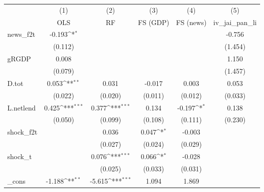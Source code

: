 {
\def\sym#1{\ifmmode^{#1}\else\(^{#1}\)\fi}
\begin{tabular}{l*{5}{c}}
\toprule
            &\multicolumn{1}{c}{(1)}&\multicolumn{1}{c}{(2)}&\multicolumn{1}{c}{(3)}&\multicolumn{1}{c}{(4)}&\multicolumn{1}{c}{(5)}\\
            &\multicolumn{1}{c}{OLS}&\multicolumn{1}{c}{RF}&\multicolumn{1}{c}{FS (GDP)}&\multicolumn{1}{c}{FS (news)}&\multicolumn{1}{c}{iv\_jai\_pan\_li}\\
\midrule
news\_f2t    &      -0.193\sym{*}  &                     &                     &                     &      -0.756         \\
            &     (0.112)         &                     &                     &                     &     (1.454)         \\
\addlinespace
gRGDP       &       0.008         &                     &                     &                     &       1.150         \\
            &     (0.079)         &                     &                     &                     &     (1.457)         \\
\addlinespace
D.tot       &       0.053\sym{**} &       0.031         &      -0.017         &       0.003         &       0.053         \\
            &     (0.022)         &     (0.020)         &     (0.011)         &     (0.012)         &     (0.033)         \\
\addlinespace
L.netlend   &       0.425\sym{***}&       0.377\sym{***}&       0.134         &      -0.197\sym{*}  &       0.138         \\
            &     (0.050)         &     (0.099)         &     (0.108)         &     (0.111)         &     (0.230)         \\
\addlinespace
shock\_f2t   &                     &       0.036         &       0.047\sym{*}  &      -0.003         &                     \\
            &                     &     (0.027)         &     (0.024)         &     (0.029)         &                     \\
\addlinespace
shock\_t     &                     &       0.076\sym{***}&       0.066\sym{*}  &      -0.028         &                     \\
            &                     &     (0.025)         &     (0.033)         &     (0.031)         &                     \\
\addlinespace
\_cons      &      -1.188\sym{**} &      -5.615\sym{***}&       1.094         &       1.869         &                     \\

\end{tabular}}

